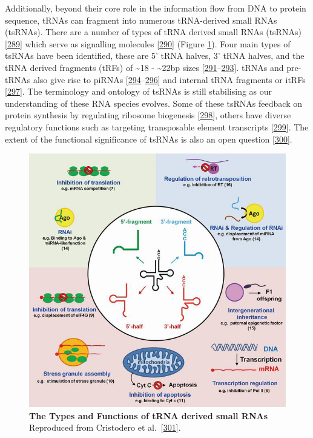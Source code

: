 \documentclass[
]{book}
\begin{document}
Additionally, beyond their core role in the information flow from DNA to protein sequence, tRNAs can fragment into numerous tRNA-derived small RNAs (tsRNAs).
There are a number of types of tRNA derived small RNAs (tsRNAs) {[}\protect\hyperlink{ref-Pliatsika2018}{289}{]} which serve as signalling molecules {[}\protect\hyperlink{ref-Lee2009}{290}{]} (Figure \ref{fig:tRNAderivedSmallRNARoles}).
Four main types of tsRNAs have been identified, these are 5' tRNA halves, 3' tRNA halves, and the tRNA derived fragments (tRFs) of \textasciitilde18 - \textasciitilde22bp sizes {[}\protect\hyperlink{ref-Torres2019}{291}--\protect\hyperlink{ref-Xu2017a}{293}{]}.
tRNAs and pre-tRNAs also give rise to piRNAs {[}\protect\hyperlink{ref-Keam2014}{294}--\protect\hyperlink{ref-Tosar2018}{296}{]} and internal tRNA fragments or itRFs {[}\protect\hyperlink{ref-Loher2017}{297}{]}.
The terminology and ontology of tsRNAs is still stabilising as our understanding of these RNA species evolves.
Some of these tsRNAs feedback on protein synthesis by regulating ribosome biogenesis {[}\protect\hyperlink{ref-Kim2017}{298}{]}, others have diverse regulatory functions such as targeting transposable element transcripts {[}\protect\hyperlink{ref-Martinez2017}{299}{]}.
The extent of the functional significance of tsRNAs is also an open question {[}\protect\hyperlink{ref-Schimmel2017}{300}{]}.

\begin{figure}

{\centering \includegraphics[width=1\linewidth]{./figs/tRNAderivedSmallRNARoles} 

}

\caption{\textbf{The Types and Functions of tRNA derived small RNAs} Reproduced from Cristodero et al.~{[}\protect\hyperlink{ref-Cristodero2017}{301}{]}.}\label{fig:tRNAderivedSmallRNARoles}
\end{figure}
\end{document}
